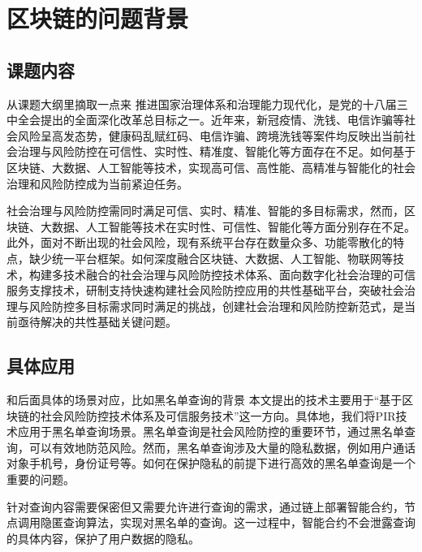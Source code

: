 \section{区块链的问题背景}

\subsection{课题内容}
{从课题大纲里摘取一点来}
推进国家治理体系和治理能力现代化，是党的十八届三中全会提出的全面深化改革总目标之一。近年来，新冠疫情、洗钱、电信诈骗等社会风险呈高发态势，健康码乱赋红码、电信诈骗、跨境洗钱等案件均反映出当前社会治理与风险防控在可信性、实时性、精准度、智能化等方面存在不足。如何基于区块链、大数据、人工智能等技术，实现高可信、高性能、高精准与智能化的社会治理和风险防控成为当前紧迫任务。

社会治理与风险防控需同时满足可信、实时、精准、智能的多目标需求，然而，区块链、大数据、人工智能等技术在实时性、可信性、智能化等方面分别存在不足。此外，面对不断出现的社会风险，现有系统平台存在数量众多、功能零散化的特点，缺少统一平台框架。如何深度融合区块链、大数据、人工智能、物联网等技术，构建多技术融合的社会治理与风险防控技术体系、面向数字化社会治理的可信服务支撑技术，研制支持快速构建社会风险防控应用的共性基础平台，突破社会治理与风险防控多目标需求同时满足的挑战，创建社会治理和风险防控新范式，是当前亟待解决的共性基础关键问题。

\subsection{具体应用}
{和后面具体的场景对应，比如黑名单查询的背景}
本文提出的技术主要用于“基于区块链的社会风险防控技术体系及可信服务技术”这一方向。具体地，我们将PIR技术应用于黑名单查询场景。黑名单查询是社会风险防控的重要环节，通过黑名单查询，可以有效地防范风险。然而，黑名单查询涉及大量的隐私数据，例如用户通话对象手机号，身份证号等。如何在保护隐私的前提下进行高效的黑名单查询是一个重要的问题。

针对查询内容需要保密但又需要允许进行查询的需求，通过链上部署智能合约，节点调用隐匿查询算法，实现对黑名单的查询。这一过程中，智能合约不会泄露查询的具体内容，保护了用户数据的隐私。
